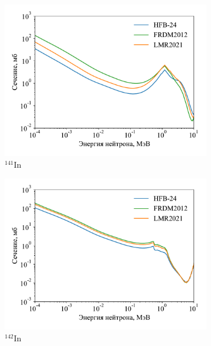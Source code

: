 \begin{figure}
  \centering
  \begin{subfigure}{0.48\textwidth}
    \centering
    \includegraphics[width=\textwidth]{../pics/cs_in141.pdf}
    \caption{${}^{141}$In}
  \end{subfigure}
  \hfill
  \begin{subfigure}{0.48\textwidth}
    \centering
    \includegraphics[width=\textwidth]{../pics/cs_in142.pdf}
    \caption{${}^{142}$In}
  \end{subfigure}
  \\
  \begin{subfigure}{0.48\textwidth}
    \centering

\end{subfigure}
\end{figure}

